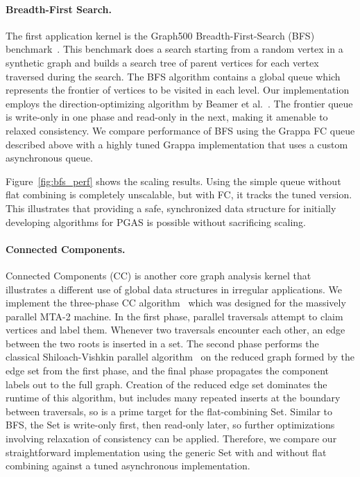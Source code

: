 \paragraph{Breadth-First Search.}
The first application kernel is the Graph500 Breadth-First-Search (BFS) benchmark~\cite{graph500list}. This benchmark does a search starting from a random vertex in a synthetic graph and builds a search tree of parent vertices for each vertex traversed during the search.
The BFS algorithm contains a global queue which represents the frontier of vertices to be visited in each level.
Our implementation employs the direction-optimizing algorithm by Beamer et al.~\cite{Beamer:Graph500}.
The frontier queue is write-only in one phase and read-only in the next, making it amenable to relaxed consistency.
We compare performance of BFS using the Grappa FC queue described above with a highly tuned Grappa implementation that uses a custom asynchronous queue.

Figure~\ref{fig:bfs_perf} shows the scaling results. Using the simple queue without flat combining is completely unscalable, but with FC, it tracks the tuned version. This illustrates that providing a safe, synchronized data structure for initially developing algorithms for PGAS is possible without sacrificing scaling.

\paragraph{Connected Components.}
Connected Components (CC) is another core graph analysis kernel that illustrates a different use of global data structures in irregular applications. We implement the three-phase CC algorithm~\cite{mtgl} which was designed for the massively parallel MTA-2 machine. In the first phase, parallel traversals attempt to claim vertices and label them.
Whenever two traversals encounter each other, an edge between the two roots is inserted in a set. 
The second phase performs the classical Shiloach-Vishkin parallel algorithm~\cite{shiloach1982n} on the reduced graph formed by the edge set from the first phase, and the final phase propagates the component labels out to the full graph.
Creation of the reduced edge set dominates the runtime of this algorithm, but includes many repeated inserts at the boundary between traversals, so is a prime target for the flat-combining Set.
Similar to BFS, the Set is write-only first, then read-only later, so further optimizations involving relaxation of consistency can be applied. Therefore, we compare our straightforward implementation using the generic Set with and without flat combining against a tuned asynchronous implementation.

